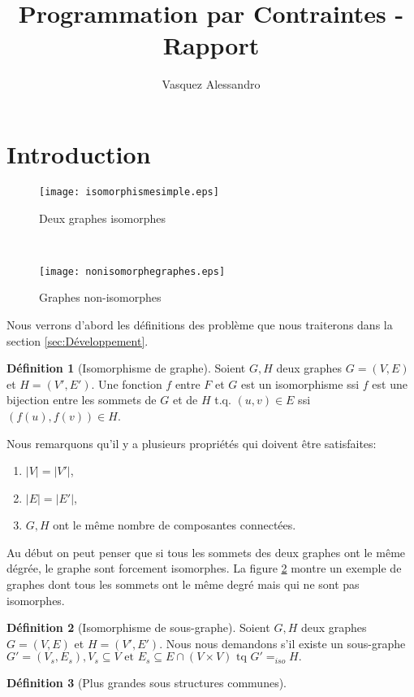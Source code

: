 \documentclass[french]{article}
\theoremstyle{definition}
\newtheorem{deff}{D\'efinition}[section]
\theoremstyle{remark}
\begin{document}
	\title{Programmation par Contraintes - Rapport}
	\author{Vasquez Alessandro}
	\maketitle
	\newpage
	\tableofcontents
	\newpage
\section{Introduction}
\label{sec:intro}
\begin{figure*}[t!]
	\begin{subfigure}[t]{0.5\textwidth}
		\centering
		\texttt{[image: isomorphismesimple.eps]}
		\caption{\label{fig:isographstar}Deux graphes isomorphes}
	\end{subfigure}%
	~ 
	\begin{subfigure}[t]{0.5\textwidth}
		\centering
		\texttt{[image: nonisomorphegraphes.eps]}
		\caption{\label{fig:nonisograph}Graphes  non-isomorphes}
	\end{subfigure}
	\caption{Isomorphisme, examples}
\end{figure*}

Nous verrons d'abord les définitions des problème que nous traiterons dans la section \ref{sec:Développement}.
\begin{deff}[Isomorphisme de graphe]
Soient $G, H$ deux graphes $G=(V, E)$ et $H=(V', E')$. Une fonction $f$ entre $ F $ et $ G $ est un isomorphisme ssi $ f $ est une bijection entre les sommets de $ G $ et de $ H $ t.q. $ (u,v) \in E$ ssi $ (f(u), f(v)) \in H$.
\end{deff}
Nous remarquons qu'il y a plusieurs propriétés qui doivent être satisfaites:
 \begin{enumerate}[label=(\roman*)]
 	\item $|V|=|V'|$,
 	\item $|E|=|E'|$,
 	\item $G, H$ ont le même nombre de composantes connectées.
 \end{enumerate}
Au début on peut penser que si tous les sommets des deux graphes ont le même dégrée, le graphe sont forcement isomorphes. 
La figure \ref{fig:nonisograph} montre un exemple de graphes dont tous les sommets ont le même degré mais qui ne sont pas isomorphes.
\begin{deff}[Isomorphisme de sous-graphe]
Soient $G, H$ deux graphes $G=(V, E)$ et $H=(V', E')$. Nous nous demandons s'il existe un sous-graphe $ G'=(V_s, E_s), V_s \subseteq V \text{ et } E_s \subseteq E \cap (V \times V) \text{ tq } G' =_{iso} H. $
\end{deff}
\begin{deff}[Plus grandes sous structures communes]
	
\end{deff}
\end{document}

